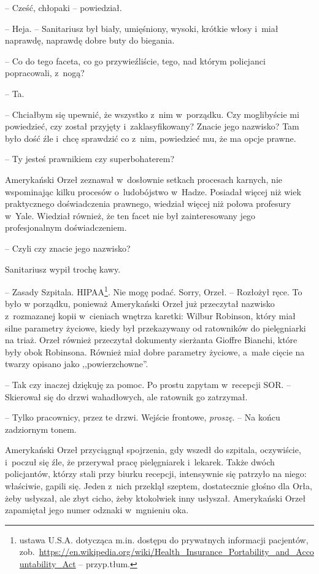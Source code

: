 \documentclass[oneside,polish,11pt,sfheadings]{mwbk}
\begin{document}
-- Cześć, chłopaki -- powiedział.

-- Heja. -- Sanitariusz był biały, umięśniony, wysoki, krótkie włosy i~miał naprawdę, naprawdę dobre buty do biegania.

-- Co do tego faceta, co go przywieźliście, tego, nad którym policjanci
popracowali, z~nogą?

-- Ta.

-- Chciałbym się upewnić, że wszystko z~nim w~porządku. Czy moglibyście
mi powiedzieć, czy został przyjęty i~zaklasyfikowany? Znacie jego
nazwisko? Tam było dość źle i~chcę sprawdzić co z~nim, powiedzieć mu, że
ma opcje prawne.

-- Ty jesteś prawnikiem czy superbohaterem?

Amerykański Orzeł zeznawał w~dosłownie setkach procesach karnych, nie
wspominając kilku procesów o~ludobójstwo w~Hadze. Posiadał więcej niż
wiek praktycznego doświadczenia prawnego, wiedział więcej niż połowa
profesury w~Yale. Wiedział również, że ten facet nie był zainteresowany
jego profesjonalnym doświadczeniem.

-- Czyli czy znacie jego nazwisko?

Sanitariusz wypił trochę kawy.

 -- Zasady Szpitala. HIPAA\footnote{ ustawa
U.S.A. dotycząca m.in. dostępu do prywatnych informacji pacjentów,
zob.~\url{https://en.wikipedia.org/wiki/Health\_Insurance\_Portability\_and\_Accountability\_Act}
-- przyp.tłum.}. Nie mogę podać. Sorry, Orzeł. -- Rozłożył ręce. To było
w porządku, ponieważ Amerykański Orzeł już przeczytał nazwisko z~rozmazanej kopii w~cieniach wnętrza karetki: Wilbur Robinson, który miał
silne parametry życiowe, kiedy był przekazywany od ratowników do
pielęgniarki na triaż. Orzeł również przeczytał dokumenty sierżanta
Gioffre Bianchi, które były obok Robinsona. Również miał dobre parametry
życiowe, a~małe cięcie na twarzy opisano jako ,,powierzchowne''.

-- Tak czy inaczej dziękuję za pomoc. Po prostu zapytam w~recepcji SOR. -- Skierował się do drzwi wahadłowych, ale ratownik go zatrzymał.

-- Tylko pracownicy, przez te drzwi. Wejście frontowe, \textit{proszę}. -- Na końcu zadziornym tonem.

Amerykański Orzeł przyciągnął spojrzenia, gdy wszedł do szpitala,
oczywiście, i~poczuł się źle, że przerywał pracę pielęgniarek i~lekarek.
Także dwóch policjantów, którzy stali przy biurku recepcji, intensywnie
się patrzyło na niego: właściwie, gapili się. Jeden z~nich przeklął
szeptem, dostatecznie głośno dla Orła, żeby usłyszał, ale zbyt cicho,
żeby ktokolwiek inny usłyszał. Amerykański Orzeł zapamiętał jego numer
odznaki w~mgnieniu oka.
\end{document}
